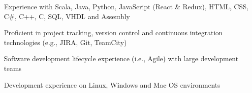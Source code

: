 \begin{cvitems}
\sectionspace
\sectionspace
\vspace{1mm}
	\fontsize{11pt}{1.4em}\bodyfontlight\upshape\color{text}
        \item {Experience with Scala, Java, Python, JavaScript (React \& Redux), HTML, CSS, C\#, C++, C, SQL, VHDL and Assembly}
        \item {Proficient in project tracking, version control and continuous integration technologies (e.g., JIRA, Git, TeamCity)}
        \item {Software development lifecycle experience (i.e., Agile) with large development teams}
        \item {Development experience on Linux, Windows and Mac OS environments}
        \end{cvitems}
\vspace{1mm}
\sectionspace